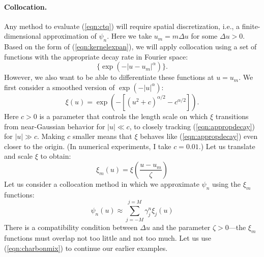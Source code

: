 \documentclass[11pt,letterpaper]{article}
\begin{document}
\paragraph{Collocation.} Any method to evaluate (\ref{eqn:ctq}) will require spatial discretization, i.e., a finite-dimensional approximation of $\psi_n$.  Here we take $u_m = m \Delta u$ for some $\Delta u > 0$.  Based on the form of (\ref{eqn:kernelexpan}), we will apply collocation using a set of functions with the appropriate decay rate in Fourier space:
\begin{equation}
\label{eqn:appropdecay}
\biggl\{ \exp( -|u - u_m|^\alpha ) \biggr\}.
\end{equation}
However, we also want to be able to differentiate these functions at $u=u_m$.  We first consider a smoothed version of $\exp(-|u|^\alpha)$:
\begin{equation}
\label{eqn:charbon}
\xi(u) =  \exp\left( - \left[ ( u^2 + c )^{\alpha/2} - c^{\alpha/2} \right] \right).
\end{equation}
Here $c > 0$ is a parameter that controls the length scale on which $\xi$ transitions from near-Gaussian behavior for $|u| \ll c$, to closely tracking (\ref{eqn:appropdecay}) for $|u| \gg c$.  Making $c$ smaller means that $\xi$ behaves like (\ref{eqn:appropdecay}) even closer to the origin.  (In numerical experiments, I take $c = 0.01$.)
Let us translate and scale $\xi$ to obtain:
\begin{equation}
\label{eqn:charbon2}
\xi_m(u) = \xi \left( \frac{ u - u_m }{\zeta} \right)
\end{equation}
Let us consider a collocation method in which we approximate $\psi_n$ using the $\xi_m$ functions:
\begin{equation}
\label{eqn:charbonmix}
\psi_n(u) \approx \sum_{j=-M}^{j=M} \gamma^n_j \xi_j(u)
\end{equation}
There is a compatibility condition between $\Delta u$ and the parameter $\zeta > 0$---the $\xi_m$ functions must overlap not too little and not too much.  Let us use (\ref{eqn:charbonmix}) to continue our earlier examples.
\end{document}
